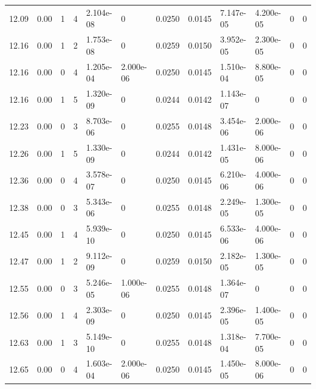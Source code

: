 \documentclass[preview]{standalone}
\begin{document}
{{{{{{{{\begin{tabular}{L{1.2cm}C{1.2cm} C{0.3cm}C{0.5cm} C{1.4cm}C{1.4cm} C{1.4cm}C{1.4cm} C{1.6cm}C{1.6cm} C{1.6cm}C{1.6cm}}
  12.09  &  0.00  & 1     &  4 &  2.104e-08  & 0  &  0.0250&   0.0145& 7.147e-05 & 4.200e-05   &  0 & 0  \\ 
  12.16  &  0.00  & 1     &  2 &  1.753e-08  & 0  &  0.0259&   0.0150& 3.952e-05 & 2.300e-05   &  0 & 0  \\ 
  12.16  &  0.00  & 0     &  4 &  1.205e-04  & 2.000e-06  &  0.0250&   0.0145& 1.510e-04 & 8.800e-05   &  0 & 0  \\ 
  12.16  &  0.00  & 1     &  5 &  1.320e-09  & 0  &  0.0244&   0.0142& 1.143e-07 & 0   &  0 & 0  \\ 
  12.23  &  0.00  & 0     &  3 &  8.703e-06  & 0  &  0.0255&   0.0148& 3.454e-06 & 2.000e-06   &  0 & 0  \\ 
  12.26  &  0.00  & 1     &  5 &  1.330e-09  & 0  &  0.0244&   0.0142& 1.431e-05 & 8.000e-06   &  0 & 0  \\ 
  12.36  &  0.00  & 0     &  4 &  3.578e-07  & 0  &  0.0250&   0.0145& 6.210e-06 & 4.000e-06   &  0 & 0  \\ 
  12.38  &  0.00  & 0     &  3 &  5.343e-06  & 0  &  0.0255&   0.0148& 2.249e-05 & 1.300e-05   &  0 & 0  \\ 
  12.45  &  0.00  & 1     &  4 &  5.939e-10  & 0  &  0.0250&   0.0145& 6.533e-06 & 4.000e-06   &  0 & 0  \\ 
  12.47  &  0.00  & 1     &  2 &  9.112e-09  & 0  &  0.0259&   0.0150& 2.182e-05 & 1.300e-05   &  0 & 0  \\ 
  12.55  &  0.00  & 0     &  3 &  5.246e-05  & 1.000e-06  &  0.0255&   0.0148& 1.364e-07 & 0   &  0 & 0  \\ 
  12.56  &  0.00  & 1     &  4 &  2.303e-09  & 0  &  0.0250&   0.0145& 2.396e-05 & 1.400e-05   &  0 & 0  \\ 
  12.63  &  0.00  & 1     &  3 &  5.149e-10  & 0  &  0.0255&   0.0148& 1.318e-04 & 7.700e-05   &  0 & 0  \\ 
  12.65  &  0.00  & 0     &  4 &  1.603e-04  & 2.000e-06  &  0.0250&   0.0145& 1.450e-05 & 8.000e-06   &  0 & 0  \\ 
\hline 
\end{tabular} 

}}}}}}}}
\end{document}

